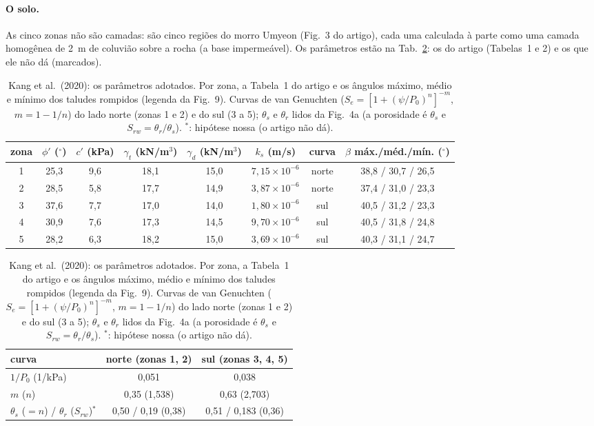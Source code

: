 \paragraph{O solo.} As cinco zonas não são camadas: são cinco regiões do morro Umyeon (Fig.~3 do artigo), cada uma
calculada à parte como uma camada homogênea de 2~m de coluvião sobre a rocha (a base impermeável). Os parâmetros
estão na Tab.~\ref{tab:kangparam}: os do artigo (Tabelas~1 e 2) e os que ele não dá (marcados).

\begin{table}[H]\centering\small
\caption{Kang et al.\ (2020): os parâmetros adotados. Por zona, a Tabela~1 do artigo e os ângulos máximo, médio e
mínimo dos taludes rompidos (legenda da Fig.~9). Curvas de van Genuchten ($S_e = [1 + (\psi/P_0)^{n}]^{-m}$,
$m = 1 - 1/n$) do lado norte (zonas 1 e 2) e do sul (3 a 5); $\theta_s$ e $\theta_r$ lidos da Fig.~4a (a porosidade
é $\theta_s$ e $S_{rw} = \theta_r/\theta_s$). $^*$: hipótese nossa (o artigo não dá).}\label{tab:kangparam}
\begin{tabular}{cccccccc}
\toprule
zona & $\phi'$ ($^\circ$) & $c'$ (kPa) & $\gamma_t$ (kN/m$^3$) & $\gamma_d$ (kN/m$^3$) & $k_s$ (m/s) & curva &
$\beta$ máx./méd./mín. ($^\circ$)\\
\midrule
1 & 25,3 & 9,6 & 18,1 & 15,0 & $7{,}15\times10^{-6}$ & norte & 38,8 / 30,7 / 26,5\\
2 & 28,5 & 5,8 & 17,7 & 14,9 & $3{,}87\times10^{-6}$ & norte & 37,4 / 31,0 / 23,3\\
3 & 37,6 & 7,7 & 17,0 & 14,0 & $1{,}80\times10^{-6}$ & sul & 40,5 / 31,2 / 23,3\\
4 & 30,9 & 7,6 & 17,3 & 14,5 & $9{,}70\times10^{-6}$ & sul & 40,5 / 31,8 / 24,8\\
5 & 28,2 & 6,3 & 18,2 & 15,0 & $3{,}69\times10^{-6}$ & sul & 40,3 / 31,1 / 24,7\\
\bottomrule
\end{tabular}

\vspace{2mm}
\begin{tabular}{lcc}
\toprule
curva & norte (zonas 1, 2) & sul (zonas 3, 4, 5)\\
\midrule
$1/P_0$ (1/kPa) & 0,051 & 0,038\\
$m$ ($n$) & 0,35 (1,538) & 0,63 (2,703)\\
$\theta_s$ ($= n$) / $\theta_r$ ($S_{rw}$)$^*$ & 0,50 / 0,19 (0,38) & 0,51 / 0,183 (0,36)\\
\bottomrule
\end{tabular}


\end{table}
